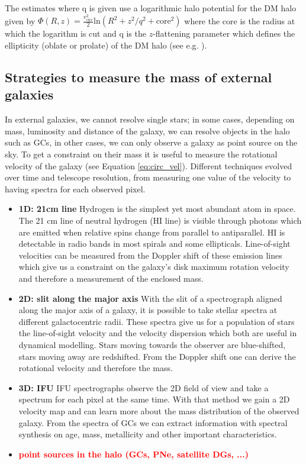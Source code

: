 The estimates where q is given use a logarithmic halo potential for the \ac{DM} halo given by $\Phi(R,z) = \frac{v_\mathrm{circ}^2}{2} \mathrm{ln}(R^2 +z^2/q^2 + \mathrm{core}^2)$ where the core is the radius at which the logarithm is cut and q is the $z$-flattening parameter which defines the ellipticity (oblate or prolate) of the \ac{DM} halo (see e.g. \citealp{Malhan...GD1stream...2018}).  

\subsection{Strategies to measure the mass of external galaxies}\label{subsec:mass_est_ext}
In external galaxies, we cannot resolve single stars; in some cases, depending on mass, luminosity and distance of the galaxy, we can resolve objects in the halo such as \acp{GC}, in other cases, we can only observe a galaxy as point source on the sky. To get a constraint on their mass it is useful to measure the rotational velocity of the galaxy (see Equation \ref{eq:circ_vel}). Different techniques evolved over time and telescope resolution, from measuring one value of the velocity to having spectra for each observed pixel.
\begin{itemize}
    \item\textbf{1D: 21cm line} Hydrogen is the simplest yet most abundant atom in space. The 21 cm line of neutral hydrogen (HI line) is visible through photons which are emitted when relative spins change from parallel to antiparallel. HI is detectable in radio bands in most spirals and some ellipticals. Line-of-sight velocities can be measured from the Doppler shift of these emission lines which give us a constraint on the galaxy's disk maximum rotation velocity and therefore a measurement of the enclosed mass.
    \item\textbf{2D: slit along the major axis} With the slit of a spectrograph aligned along the major axis of a galaxy, it is possible to take stellar spectra at different galactocentric radii. These spectra give us for a population of stars the line-of-sight velocity and the velocity dispersion which both are useful in dynamical modelling. Stars moving towards the observer are blue-shifted, stars moving away are redshifted. From the Doppler shift one can derive the rotational velocity and therefore the mass. 
    \item \textbf{3D: \acl{IFU}} \ac{IFU} spectrographs observe the 2D field of view and take a spectrum for each pixel at the same time. With that method we gain a 2D velocity map and can learn more about the mass distribution of the observed galaxy. From the spectra of \acp{GC} we can extract information with spectral synthesis on age, mass, metallicity and other important characteristics. 
    \item \textbf{\textcolor{red}{point sources in the halo (GCs, PNe, satellite DGs, ...)}}
\end{itemize}

